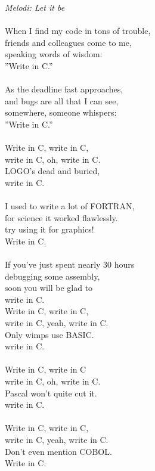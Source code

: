 {\footnotesize\textit{Melodi: Let it be}}\\
\\
When I find my code in tons of trouble,\\
friends and colleagues come to me,\\
speaking words of wisdom:\\
”Write in C.”\\
\\
As the deadline fast approaches,\\
and bugs are all that I can see,\\
somewhere, someone whispers:\\
”Write in C.”\\
\\
Write in C, write in C,\\
write in C, oh, write in C.\\
LOGO’s dead and buried,\\
write in C.\\
\\
I used to write a lot of FORTRAN,\\
for science it worked flawlessly.\\
try using it for graphics!\\
Write in C.\\
\\
If you’ve just spent nearly 30 hours\\
debugging some assembly,\\
soon you will be glad to\\
write in C.\\
\newpage
Write in C, write in C,\\
write in C, yeah, write in C.\\
Only wimps use BASIC.\\
write in C.\\
\\
Write in C, write in C \\
write in C, oh, write in C.\\
Pascal won’t quite cut it.\\
write in C.\\
\\
Write in C, write in C,\\
write in C, yeah, write in C.\\
Don’t even mention COBOL.\\
Write in C.
